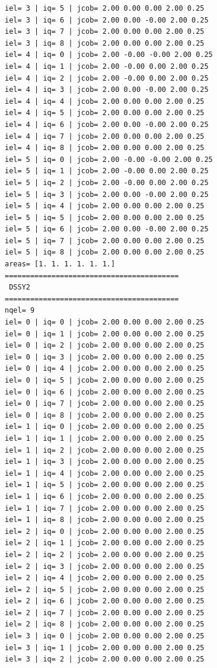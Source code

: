 \begin{tiny}
\begin{verbatim}
iel= 3 | iq= 5 | jcob= 2.00 0.00 0.00 2.00 0.25
iel= 3 | iq= 6 | jcob= 2.00 0.00 -0.00 2.00 0.25
iel= 3 | iq= 7 | jcob= 2.00 0.00 0.00 2.00 0.25
iel= 3 | iq= 8 | jcob= 2.00 0.00 0.00 2.00 0.25
iel= 4 | iq= 0 | jcob= 2.00 -0.00 -0.00 2.00 0.25
iel= 4 | iq= 1 | jcob= 2.00 -0.00 0.00 2.00 0.25
iel= 4 | iq= 2 | jcob= 2.00 -0.00 0.00 2.00 0.25
iel= 4 | iq= 3 | jcob= 2.00 0.00 -0.00 2.00 0.25
iel= 4 | iq= 4 | jcob= 2.00 0.00 0.00 2.00 0.25
iel= 4 | iq= 5 | jcob= 2.00 0.00 0.00 2.00 0.25
iel= 4 | iq= 6 | jcob= 2.00 0.00 -0.00 2.00 0.25
iel= 4 | iq= 7 | jcob= 2.00 0.00 0.00 2.00 0.25
iel= 4 | iq= 8 | jcob= 2.00 0.00 0.00 2.00 0.25
iel= 5 | iq= 0 | jcob= 2.00 -0.00 -0.00 2.00 0.25
iel= 5 | iq= 1 | jcob= 2.00 -0.00 0.00 2.00 0.25
iel= 5 | iq= 2 | jcob= 2.00 -0.00 0.00 2.00 0.25
iel= 5 | iq= 3 | jcob= 2.00 0.00 -0.00 2.00 0.25
iel= 5 | iq= 4 | jcob= 2.00 0.00 0.00 2.00 0.25
iel= 5 | iq= 5 | jcob= 2.00 0.00 0.00 2.00 0.25
iel= 5 | iq= 6 | jcob= 2.00 0.00 -0.00 2.00 0.25
iel= 5 | iq= 7 | jcob= 2.00 0.00 0.00 2.00 0.25
iel= 5 | iq= 8 | jcob= 2.00 0.00 0.00 2.00 0.25
areas= [1. 1. 1. 1. 1. 1.]
=========================================
 DSSY2
=========================================
nqel= 9
iel= 0 | iq= 0 | jcob= 2.00 0.00 0.00 2.00 0.25
iel= 0 | iq= 1 | jcob= 2.00 0.00 0.00 2.00 0.25
iel= 0 | iq= 2 | jcob= 2.00 0.00 0.00 2.00 0.25
iel= 0 | iq= 3 | jcob= 2.00 0.00 0.00 2.00 0.25
iel= 0 | iq= 4 | jcob= 2.00 0.00 0.00 2.00 0.25
iel= 0 | iq= 5 | jcob= 2.00 0.00 0.00 2.00 0.25
iel= 0 | iq= 6 | jcob= 2.00 0.00 0.00 2.00 0.25
iel= 0 | iq= 7 | jcob= 2.00 0.00 0.00 2.00 0.25
iel= 0 | iq= 8 | jcob= 2.00 0.00 0.00 2.00 0.25
iel= 1 | iq= 0 | jcob= 2.00 0.00 0.00 2.00 0.25
iel= 1 | iq= 1 | jcob= 2.00 0.00 0.00 2.00 0.25
iel= 1 | iq= 2 | jcob= 2.00 0.00 0.00 2.00 0.25
iel= 1 | iq= 3 | jcob= 2.00 0.00 0.00 2.00 0.25
iel= 1 | iq= 4 | jcob= 2.00 0.00 0.00 2.00 0.25
iel= 1 | iq= 5 | jcob= 2.00 0.00 0.00 2.00 0.25
iel= 1 | iq= 6 | jcob= 2.00 0.00 0.00 2.00 0.25
iel= 1 | iq= 7 | jcob= 2.00 0.00 0.00 2.00 0.25
iel= 1 | iq= 8 | jcob= 2.00 0.00 0.00 2.00 0.25
iel= 2 | iq= 0 | jcob= 2.00 0.00 0.00 2.00 0.25
iel= 2 | iq= 1 | jcob= 2.00 0.00 0.00 2.00 0.25
iel= 2 | iq= 2 | jcob= 2.00 0.00 0.00 2.00 0.25
iel= 2 | iq= 3 | jcob= 2.00 0.00 0.00 2.00 0.25
iel= 2 | iq= 4 | jcob= 2.00 0.00 0.00 2.00 0.25
iel= 2 | iq= 5 | jcob= 2.00 0.00 0.00 2.00 0.25
iel= 2 | iq= 6 | jcob= 2.00 0.00 0.00 2.00 0.25
iel= 2 | iq= 7 | jcob= 2.00 0.00 0.00 2.00 0.25
iel= 2 | iq= 8 | jcob= 2.00 0.00 0.00 2.00 0.25
iel= 3 | iq= 0 | jcob= 2.00 0.00 0.00 2.00 0.25
iel= 3 | iq= 1 | jcob= 2.00 0.00 0.00 2.00 0.25
iel= 3 | iq= 2 | jcob= 2.00 0.00 0.00 2.00 0.25

\end{verbatim}
\end{tiny}
